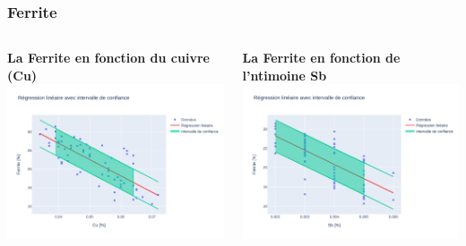 \documentclass[aspectratio=169]{beamer}
\begin{document}
\begin{frame}
\frametitle{Ferrite}
\begin{columns}[t]
  \begin{column}{0.5\textwidth}
    \centering
    \textbf{La Ferrite en fonction du cuivre (Cu)} \\
    \includegraphics[width=\textwidth]{Figures/Regression_Ferrite_Cu.pdf} 
  \end{column}
  \begin{column}{0.5\textwidth}
    \centering
    \textbf{La Ferrite en fonction de l'ntimoine Sb} \\
    \includegraphics[width=\textwidth]{Figures/Regression_Ferrite_Sb.pdf} 
  \end{column}
\end{columns}
\end{frame}
\end{document}
